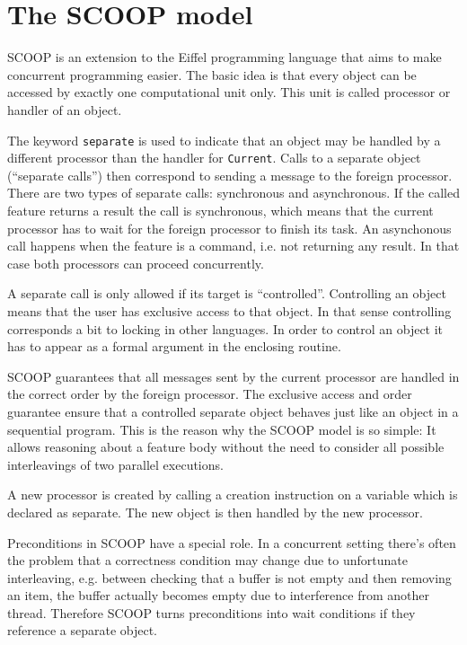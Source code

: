  
\section {The SCOOP model}
\label {sec:scoop-model}

SCOOP is an extension to the Eiffel programming language that aims to make concurrent programming easier.
The basic idea is that every object can be accessed by exactly one computational unit only.
This unit is called processor or handler of an object.

The keyword \lstinline!separate! is used to indicate that an object may be handled by a different processor than the handler for \lstinline!Current!.
Calls to a separate object (``separate calls'') then correspond to sending a message to the foreign processor.
There are two types of separate calls: synchronous and asynchronous.
If the called feature returns a result the call is synchronous, which means that the current processor has to wait for the foreign processor to finish its task.
An asynchonous call happens when the feature is a command, i.e. not returning any result.
In that case both processors can proceed concurrently.

A separate call is only allowed if its target is ``controlled''.
Controlling an object means that the user has exclusive access to that object.
In that sense controlling corresponds a bit to locking in other languages.
In order to control an object it has to appear as a formal argument in the enclosing routine.

SCOOP guarantees that all messages sent by the current processor are handled in the correct order by the foreign processor.
The exclusive access and order guarantee ensure that a controlled separate object behaves just like an object in a sequential program.
This is the reason why the SCOOP model is so simple: 
It allows reasoning about a feature body without the need to consider all possible interleavings of two parallel executions.

A new processor is created by calling a creation instruction on a variable which is declared as separate.
The new object is then handled by the new processor.

Preconditions in SCOOP have a special role.
In a concurrent setting there's often the problem that a correctness condition may change due to unfortunate interleaving, 
e.g. between checking that a buffer is not empty and then removing an item, the buffer actually becomes empty due to interference from another thread.
Therefore SCOOP turns preconditions into wait conditions if they reference a separate object.

